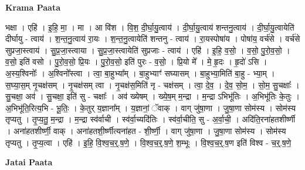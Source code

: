 \documentclass[17pt]{extarticle}
\begin{document}
\textbf{Krama Paata} \newline

भक्षा । एहि॑ । इ॒हि॒ मा॒ । मा । आ वि॑श । वि॒श॒ दी॒र्घा॒यु॒त्वाय॑ । दी॒र्घा॒यु॒त्वाय॑ शन्तनु॒त्वाय॑ । दी॒र्घा॒यु॒त्वायेति॑ दीर्घायु - त्वाय॑ । श॒न्त॒नु॒त्वाय॑ रा॒यः । श॒न्त॒नु॒त्वायेति॑ शन्तनु - त्वाय॑ । रा॒यस्पोषा॑य । पोषा॑य॒ वर्च॑से । वर्च॑से सुप्रजा॒स्त्वाय॑ । सु॒प्र॒जा॒स्त्वाया । सु॒प्र॒जा॒स्त्वायेति॑ सुप्रजाः - त्वाय॑ । एहि॑ । इ॒हि॒ व॒सो॒ । व॒सो॒ पु॒रो॒व॒सो॒ । व॒सो॒ इति॑ वसो । पु॒रो॒व॒सो॒ प्रि॒यः । पु॒रो॒व॒सो॒ इति॑ पुरः - व॒सो॒ । प्रि॒यो मे᳚ । मे॒ हृ॒दः । हृ॒दो॑ ऽसि । अ॒स्य॒श्विनोः᳚ । अ॒श्विनो᳚स्त्वा । त्वा॒ बा॒हुभ्या᳚म् । बा॒हुभ्याꣳ॑ सघ्यासम् । बा॒हुभ्या॒मिति॑ बा॒हु - भ्या॒म् । स॒घ्या॒स॒म् नृ॒चक्ष॑सम् । नृ॒चक्ष॑सम् त्वा । नृ॒चक्ष॑स॒मिति॑ नृ - चक्ष॑सम् । त्वा॒ दे॒व॒ । दे॒व॒ सो॒म॒ । सो॒म॒ सु॒चक्षाः᳚ । सु॒चक्षा॒ अव॑ । सु॒चक्षा॒ इति॑ सु - चक्षाः᳚ । अव॑ ख्येषम् । ख्ये॒ष॒म् म॒न्द्रा । म॒न्द्रा ऽभिभू॑तिः । अ॒भिभू॑तिः के॒तुः । अ॒भिभू॑ति॒रित्य॒भि - भू॒तिः॒ । के॒तुर् य॒ज्ञाना᳚म् । य॒ज्ञानां॒ ॅवाक् । वाग् जु॑षा॒णा । जु॒षा॒णा सोम॑स्य । सोम॑स्य तृप्यतु । तृ॒प्य॒तु॒ म॒न्द्रा । म॒न्द्रा स्व॑र्वाची । स्व॑र्वा॒च्यदि॑तिः । स्व॑र्वा॒चीति॒ सु - अ॒र्वा॒ची॒ । अदि॑ति॒रना॑हतशीर्ष्णी । अना॑हतशीर्ष्णी॒ वाक् । अना॑हतशी॒र्ष्णीत्यना॑हत - शी॒र्ष्णी॒ । वाग् जु॑षा॒णा । जु॒षा॒णा सोम॑स्य । सोम॑स्य तृप्यतु । तृ॒प्य॒त्वा । एहि॑ । इ॒हि॒ वि॒श्व॒च॒र्॒.ष॒णे॒ । वि॒श्व॒च॒र्॒.ष॒णे॒ श॒म्भूः । वि॒श्व॒च॒र्॒.ष॒ण इति॑ विश्व - च॒र्॒.ष॒णे॒ \newline

\textbf{Jatai Paata} \newline
\end{document}
